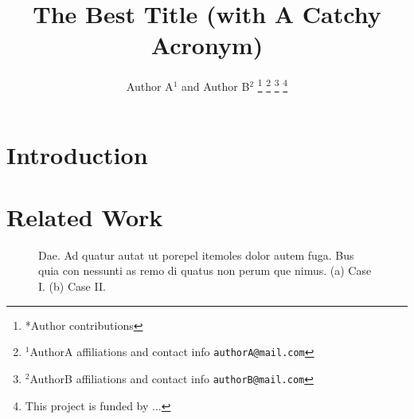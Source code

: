 \documentclass[letterpaper, 10 pt, conference, onecolumn]{IEEEtran}
\begin{document}
\title{\LARGE \bf The Best Title (with A Catchy Acronym)}
\author{Author A$^{1}$ and Author B$^{2}$
    \thanks{*Author contributions}
    \thanks{$^{1}$AuthorA affiliations and contact info
            {\tt\small authorA@mail.com}
    }
    \thanks{$^{2}$AuthorB affiliations and contact info
            {\tt\small authorB@mail.com}
    }
    \thanks{This project is funded by ...}
}
\maketitle

\begin{abstract}
    \lipsum[1-3]
\end{abstract}


\section{Introduction}

\lipsum[1-3]



\section{Related Work}
\lipsum[1-3]

\begin{figure}[!t]
    \centering
    \hfil
    \caption{Dae. Ad quatur autat ut porepel itemoles dolor autem fuga. Bus quia con nessunti as remo di quatus non perum que nimus. (a) Case I. (b) Case II.}
    \label{fig_sim}
\end{figure}
\end{document}
